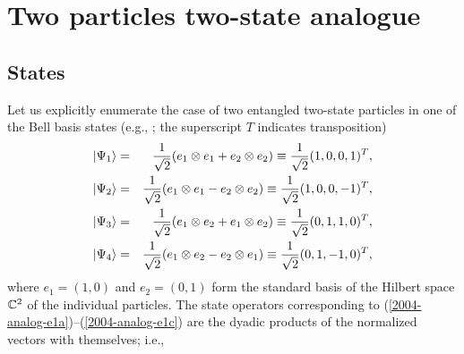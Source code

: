 \documentclass[pra,preprint,showpacs,showkeys,amsfonts]{revtex4}
\begin{document}
\section{Two particles two-state analogue}


\subsection{States}

Let us explicitly enumerate the case of two entangled two-state particles in
one of the Bell basis states (e.g., \cite{horo-96};  the superscript $T$ indicates transposition)
\begin{eqnarray}
\vert \Psi_1 \rangle &=& {1\over \sqrt{2}}( e_1 \otimes e_1 + e_2 \otimes e_2) \equiv {1\over \sqrt{2}}(1,0,0,1)^T, \label{2004-analog-e1a}\\
\vert \Psi_2 \rangle &=& {1\over \sqrt{2}}( e_1 \otimes e_1 - e_2 \otimes e_2) \equiv {1\over \sqrt{2}}(1,0,0,-1)^T, \label{2004-analog-e1b}\\
\vert \Psi_3 \rangle &=& {1\over \sqrt{2}}( e_1 \otimes e_2 + e_1 \otimes e_2) \equiv {1\over \sqrt{2}}(0,1,1,0)^T, \label{2004-analog-e1c}\\
\vert \Psi_4 \rangle &=& {1\over \sqrt{2}}( e_1 \otimes e_2 - e_2 \otimes e_1) \equiv {1\over \sqrt{2}}(0,1,-1,0)^T,\label{2004-analog-e1d}
\end{eqnarray}
where $e_1=(1,0)$ and $e_2=(0,1)$ form the standard basis of the Hilbert space
${\Bbb C}^2$
of the individual particles.
The state operators corresponding to
(\ref{2004-analog-e1a})--(\ref{2004-analog-e1c})
are the dyadic products of the normalized vectors with themselves; i.e.,
\end{document}
